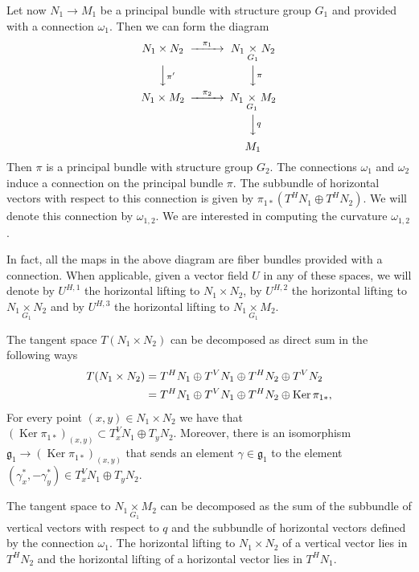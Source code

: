 \documentclass[10pt,twoside]{article}
\numberwithin{equation}{section}
\theoremstyle{plain}
\theoremstyle{definition}
\DeclareMathOperator{\Ker}{Ker}
\begin{document}
Let now $N_{1}\longrightarrow M_{1}$ be a principal bundle with
structure group
$G_{1}$ and provided with a connection $\omega _{1}$. Then we can form
the diagram
\begin{displaymath}
  \begin{CD}
  N_{1}\times N_{2} @>\pi_{1}>> N_{1}\underset{G_{1}}
    {\times}N_{2}\\
    @VV\pi' V @VV\pi V\\
    N_{1}\times M_{2} @>\pi_{2}>> N_{1}\underset{G_{1}}
    {\times}M_{2}\\
    @. @VV q V\\
    @. M_{1}
\end{CD}
\end{displaymath}
Then $\pi$ is a principal bundle with structure group $G_{2}$. The
connections $\omega _{1}$ and $\omega _{2}$ induce a connection on the
principal bundle $\pi$. The subbundle of horizontal vectors with
respect to this connection is given by $\pi_{1\ast}(T^{H}N_{1}\oplus
T^{H}N_{2})$. We will denote this connection by $\omega _{1,2}$. We
are interested in computing the curvature $\omega _{1,2}$.

In fact, all the maps in the above diagram are fiber bundles provided
with a connection. When applicable, given a vector field $U$ in any of
these spaces, we will denote by $U^{H,1}$ the horizontal lifting to 
$N_{1}\times N_{2}$, by $U^{H,2}$ the horizontal lifting
to $N_{1}\underset {G_{1}}{\times}N_{2}$ and by $U^{H,3}$ the
horizontal lifting to $N_{1}\underset {G_{1}}{\times}M_{2}$.
 

The tangent space $T(N_{1}\times N_{2})$ can be decomposed as direct
sum in the following ways
\begin{align}
  T(N_{1}\times N_{2})&=
  T^{H}N_{1}\oplus T^{V}N_{1}\oplus T^{H}N_{2}\oplus T^{V}N_{2}\notag \\
  &=T^{H}N_{1}\oplus T^{V}N_{1}\oplus T^{H}N_{2}\oplus \Ker
  \pi_{1\ast},\label{eq:3}   
\end{align}
For every point $(x,y)\in N_{1}\times N_{2}$ we have that
$(\Ker \pi_{1\ast})_{(x,y)}\subset T^{V}_{x}N_{1}\oplus
T_{y}N_{2}$. Moreover, there is an isomorphism
$\mathfrak{g}_{1}\longrightarrow (\Ker \pi_{1\ast})_{(x,y)}$ that
sends an element $\gamma \in \mathfrak{g}_{1}$ to 
the element $(\gamma ^{\ast}_{x},-\gamma ^{\ast}_{y})\in T^{V}_{x}N_{1}\oplus
T_{y}N_{2}$.

The tangent space to $N_{1}\underset {G_{1}}{\times}M_{2}$ can be
decomposed as the sum of the subbundle of vertical vectors with
respect to $q$ and the subbundle of horizontal vectors defined by the
connection $\omega _{1}$. The horizontal lifting to $N_{1}\times
N_{2}$ of a vertical vector lies in $T^{H}N_{2}$ and the
horizontal lifting of  a horizontal vector lies in $T^{H}N_{1}$.
\end{document}
